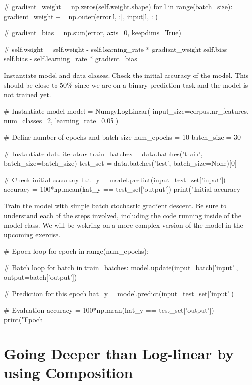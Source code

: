 \begin{exercise}
\begin{python}
        #
        gradient_weight = np.zeros(self.weight.shape)
        for l in range(batch_size):
            gradient_weight += np.outer(error[l, :], input[l, :])

        #
        gradient_bias = np.sum(error, axis=0, keepdims=True)

        #
        self.weight = self.weight - self.learning_rate * gradient_weight
        self.bias = self.bias - self.learning_rate * gradient_bias
\end{python}
Instantiate model and data classes. Check the initial accuracy of the model. This should be close to $50\%$ since we are on a binary prediction task and the model is not trained yet.
\begin{python}
# Instantiate model
model = NumpyLogLinear(
    input_size=corpus.nr_features,
    num_classes=2,
    learning_rate=0.05
)

# Define number of epochs and batch size
num_epochs = 10
batch_size = 30

# Instantiate data iterators
train_batches = data.batches('train', batch_size=batch_size)
test_set = data.batches('test', batch_size=None)[0]

# Check initial accuracy
hat_y = model.predict(input=test_set['input'])
accuracy = 100*np.mean(hat_y == test_set['output'])
print("Initial accuracy %

\end{python}
Train the model with simple batch stochastic gradient descent. Be sure to understand each of the steps involved, including the code running inside of the model class. We will be wokring on a more complex version of the model in the upcoming exercise.
\begin{python}
# Epoch loop
for epoch in range(num_epochs):

    # Batch loop
    for batch in train_batches:
        model.update(input=batch['input'], output=batch['output'])

    # Prediction for this epoch
    hat_y = model.predict(input=test_set['input'])

    # Evaluation
    accuracy = 100*np.mean(hat_y == test_set['output'])
    print("Epoch %
\end{python}

\end{exercise}



\section{Going Deeper than Log-linear by using Composition}
\label{sec:deep_forward}

